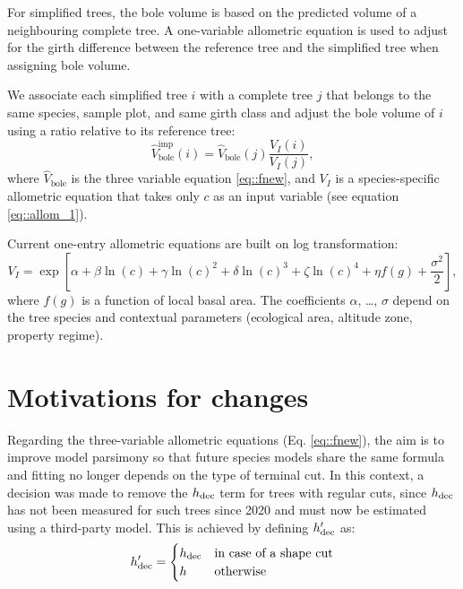 For simplified trees, the bole volume is based on the predicted volume of a neighbouring complete tree. A one-variable allometric equation is used to adjust for the girth difference between the reference tree and the simplified tree when assigning bole volume.
\begin{tcolorbox}[breakable, title = Volume imputation]
We associate each simplified tree \( i \) with a complete tree \( j \) that belongs to the same species, sample plot, and same girth class and adjust the bole volume of \( i \) using a ratio relative to its reference tree:
	\begin{equation}
		\hat{V}_{\text{bole}}^{\text{imp}}(i) = \hat{V}_{\text{bole}}(j) \frac{V_{I}(i)}{V_{I}(j)},
		\label{eq::imputation}
	\end{equation}
	where \( \hat{V}_{\text{bole}} \) is the three variable equation \eqref{eq::fnew}, and \( V_{I} \) is a species-specific allometric equation that takes only \( c \) as an input variable (see equation \eqref{eq::allom_1}).
\end{tcolorbox}

Current one-entry allometric equations are built on log transformation:  
\begin{equation}
	V_{I} = \exp \left[ \alpha + \beta \ln(c) + \gamma \ln(c)^2 + \delta \ln(c)^3 + \zeta \ln(c)^4 + \eta f(g) + \frac{\sigma^2}{2} \right],
	\label{eq::allom_1}
\end{equation}
where \( f(g) \) is a function of local basal area. The coefficients \( \alpha \), \dots, \( \sigma \) depend on the tree species and contextual parameters (ecological area, altitude zone, property regime). 

\section{Motivations for changes}

Regarding the three-variable allometric equations (Eq. \eqref{eq::fnew}), the aim is to improve model parsimony so that future species models share the same formula and fitting no longer depends on the type of terminal cut. In this context, a decision was made to remove the \( h_{\text{dec}} \) term for trees with regular cuts, since \( h_{\text{dec}} \) has not been measured for such trees since 2020 and must now be estimated using a third-party model. This is achieved by defining \( h_{\text{dec}}' \) as:
\[
	h_{\text{dec}}' =
	\begin{cases}
		h_{\text{dec}} & \text{in case of a shape cut} \\
		h & \text{otherwise}
	\end{cases}
\]

